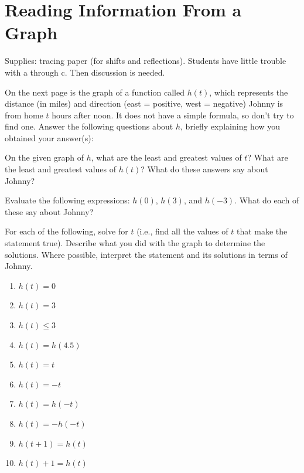 \newpage
\section{Reading Information From a Graph}

\begin{teachingnote}
Supplies:  tracing paper (for shifts and reflections).  
Students have little trouble with a through c.  Then discussion is needed. 
\end{teachingnote}

On the next page is the graph of a function called $h(t)$, which
represents the distance (in miles) and direction (east = positive,
west = negative) Johnny is from home $t$ hours after noon. It does not
have a simple formula, so don't try to find one. Answer the following
questions about $h$, briefly explaining how you obtained your
answer(s):

\begin{prob}
On the given graph of $h$, what are the least and greatest values
of $t$? What are the least and greatest values of $h(t)$? What do
these answers say about Johnny?
\end{prob}

\begin{prob}
Evaluate the following expressions: $h(0)$, $h(3)$, and $h(-3)$. What
do each of these say about Johnny? 
\end{prob}

\begin{prob}
For each of the following, solve for $t$ (i.e., find all the values of
$t$ that make the statement true). Describe what you did with the
graph to determine the solutions.  Where possible, interpret
the statement and its solutions in terms of Johnny.

\begin{enumerate}
\item $h(t) = 0$
\item $h(t) = 3$
\item $h(t) \leq 3$
\item $h(t) = h(4.5)$
\item $h(t) = t$
\item $h(t) = -t$
\item $h(t) = h(-t)$
\item $h(t) = -h(-t)$
\item $h(t+1) = h(t)$
\item $h(t)+1 = h(t)$
\end{enumerate}
\end{prob}

